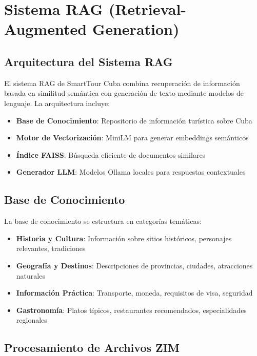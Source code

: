 \documentclass[runningheads]{llncs}
\begin{document}
\section{Sistema RAG (Retrieval-Augmented Generation)}

\subsection{Arquitectura del Sistema RAG}

El sistema RAG de SmartTour Cuba combina recuperación de información basada en similitud semántica con generación de texto mediante modelos de lenguaje. La arquitectura incluye:

\begin{itemize}
\item \textbf{Base de Conocimiento}: Repositorio de información turística sobre Cuba
\item \textbf{Motor de Vectorización}: MiniLM para generar embeddings semánticos
\item \textbf{Índice FAISS}: Búsqueda eficiente de documentos similares
\item \textbf{Generador LLM}: Modelos Ollama locales para respuestas contextuales
\end{itemize}

\subsection{Base de Conocimiento}

La base de conocimiento se estructura en categorías temáticas:

\begin{itemize}
\item \textbf{Historia y Cultura}: Información sobre sitios históricos, personajes relevantes, tradiciones
\item \textbf{Geografía y Destinos}: Descripciones de provincias, ciudades, atracciones naturales
\item \textbf{Información Práctica}: Transporte, moneda, requisitos de visa, seguridad
\item \textbf{Gastronomía}: Platos típicos, restaurantes recomendados, especialidades regionales
\end{itemize}

\subsection{Procesamiento de Archivos ZIM}
\end{document}

